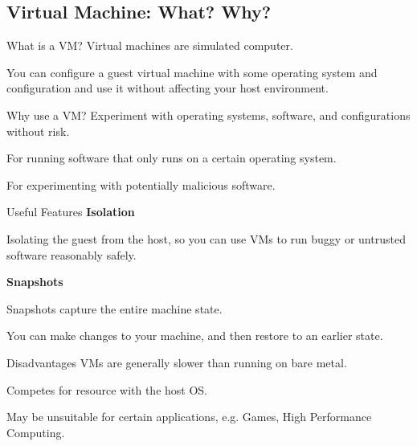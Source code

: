 \documentclass[11pt]{beamer}
\begin{document}
\subsection{Virtual Machine: What? Why?}
\begin{frame}{What is a VM?}
  Virtual machines are simulated computer.

  You can configure a guest virtual machine with some operating system and configuration and use it without affecting your host environment.
\end{frame}

\begin{frame}{Why use a VM?}
  Experiment with operating systems, software, and configurations without risk.

  For running software that only runs on a certain operating system.

  For experimenting with potentially malicious software.
\end{frame}

\begin{frame}{Useful Features}
  \textbf{Isolation}

  Isolating the guest from the host, so you can use VMs to run buggy or untrusted software reasonably safely.

  \textbf{Snapshots}

  Snapshots capture the entire machine state.

  You can make changes to your machine, and then restore to an earlier state.

\end{frame}

\begin{frame}{Disadvantages}
  VMs are generally slower than running on bare metal.

  Competes for resource with the host OS.

  May be unsuitable for certain applications, e.g. Games, High Performance Computing.
\end{frame}
\end{document}
